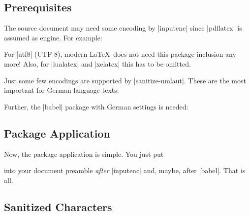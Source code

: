 \documentclass[a4paper,11pt]{ltxdoc}
\begin{document}
\subsection{Prerequisites}
The source document may need some encoding by |inputenc| since |pdflatex|
is assumed as engine. For example:

\begin{dispListing}
\usepackage[latin1]{inputenc}
\end{dispListing}

For |utf8| (UTF-8), modern \LaTeX\ does not need this package inclusion any more!
Also, for |lualatex| and |xelatex| this has to be omitted.

Just some few encodings are supported by |sanitize-umlaut|.
These are the most important for German language texts:


Further, the |babel| package with German settings is needed:

\begin{dispListing}
\usepackage[ngerman]{babel}
\end{dispListing}

\subsection{Package Application}
Now, the package application is simple. You just put

\begin{dispListing}
\usepackage{sanitize-umlaut}
\end{dispListing}

into your document preamble \emph{after} |inputenc| and, maybe, after |babel|.
That is all.


\subsection{Sanitized Characters}
\end{document}
